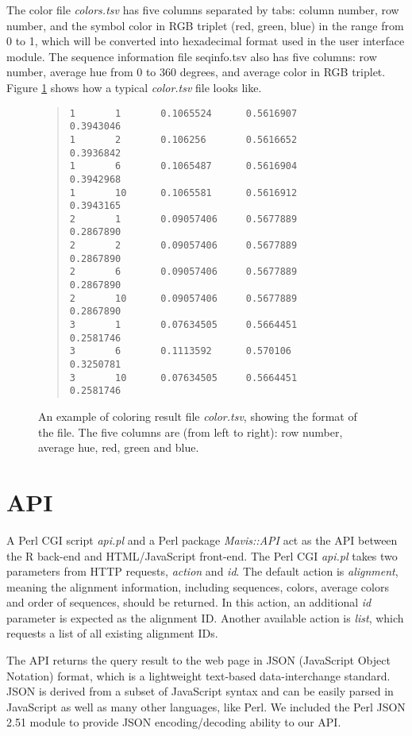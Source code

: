 The color file \emph{colors.tsv} has five columns separated by tabs: column number, row number, and the symbol color in RGB triplet (red, green, blue) in the range from 0 to 1, which will be converted into hexadecimal format used in the user interface module. The sequence information file seqinfo.tsv also has five columns: row number, average hue from 0 to 360 degrees, and average color in RGB triplet. Figure \ref{fig:color.tsv} shows how a typical \emph{color.tsv} file looks like.
\begin{figure}[hb]
\begin{quote}
\begin{verbatim}
1       1       0.1065524      0.5616907       0.3943046
1       2       0.106256       0.5616652       0.3936842
1       6       0.1065487      0.5616904       0.3942968
1       10      0.1065581      0.5616912       0.3943165
2       1       0.09057406     0.5677889       0.2867890
2       2       0.09057406     0.5677889       0.2867890
2       6       0.09057406     0.5677889       0.2867890
2       10      0.09057406     0.5677889       0.2867890
3       1       0.07634505     0.5664451       0.2581746
3       6       0.1113592      0.570106        0.3250781
3       10      0.07634505     0.5664451       0.2581746
\end{verbatim}
\end{quote}
\caption[Example of Coloring Result File]{An example of coloring result file \emph{color.tsv}, showing the format of the file. The five columns are (from left to right): row number, average hue, red, green and blue.}\label{fig:color.tsv}
\end{figure}

\section{API}

A Perl CGI script \emph{api.pl} and a Perl package \emph{Mavis::API} act as the API between the R back-end and HTML/JavaScript front-end. The Perl CGI \emph{api.pl} takes two parameters from HTTP requests, \emph{action} and \emph{id}. The default action is \emph{alignment}, meaning the alignment information, including sequences, colors, average colors and order of sequences, should be returned. In this action, an additional \emph{id} parameter is expected as the alignment ID. Another available action is \emph{list}, which requests a list of all existing alignment IDs.

The API returns the query result to the web page in JSON (JavaScript Object Notation) format, which is a lightweight text-based data-interchange standard. JSON is derived from a subset of JavaScript syntax and can be easily parsed in JavaScript as well as many other languages, like Perl. We included the Perl JSON 2.51 module to provide JSON encoding/decoding ability to our API. \cite{crockford2006application}

